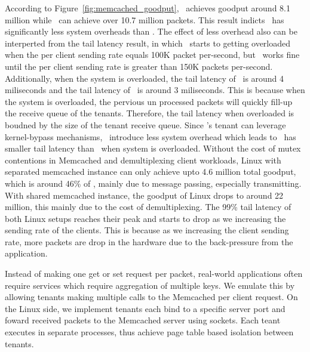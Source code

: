 According to Figure~\ref{fig:memcached_goodput}, \cos\ achieves goodput around 8.1 million while \name\ can achieve over 10.7 million packets.
This result indicts \name\ has significantly less system overheads than \cos .
The effect of less overhead also can be interperted from the tail latency result, in which \cos\ starts to getting overloaded when the per client sending rate equals 100K packet per-second, but \name\ works fine until the per client sending rate is greater than 150K packets per-second.
Additionally, when the system is overloaded, the tail latency of \cos\ is around 4 miliseconds and the tail latency of \name\ is around 3 miliseconds.
This is because when the system is overloaded, the pervious un processed packets will quickly fill-up the receive queue of the tenants.
Therefore, the tail latency when overloaded is boudned by the size of the tenant receive queue.
Since \name 's tenant can leverage kernel-bypass mechanisms, \name\ introduce less system overhead which leads to \name\ has smaller tail latency than \cos\ when system is overloaded.
Without the cost of mutex contentions in Memcached and demultiplexing client workloads, Linux with separated memcached instance can only achieve upto 4.6 million total goodput, which is around 46\% of \name , mainly due to message passing, especially transmitting. 
With shared memcached instance, the goodput of Linux drops to around 22 million, this mainly due to the cost of demultiplexing.
The 99\% tail latency of both Linux setups reaches their peak and starts to drop as we increasing the sending rate of the clients.
This is because as we increasing the client sending rate, more packets are drop in the hardware due to the back-pressure from the application. 

Instead of making one get or set request per packet, real-world applications often require services which require aggregation of multiple keys.
We emulate this by allowing tenants making multiple calls to the Memcached per client request.
On the Linux side, we implement tenants each bind to a specific server port and foward received packets to the Memcached server using sockets.
Each teant executes in separate processes, thus achieve page table based isolation between tenants.

